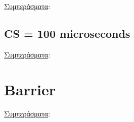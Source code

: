 \documentclass{dit}
\newcommand{\en}[1]{\foreignlanguage{english}{#1}}
\begin{document}
\underline{Συμπεράσματα}:


\newpage

\subsection*{\en{CS = 100 microseconds}}
\begin{otherlanguage}{english}

\end{otherlanguage}

\underline{Συμπεράσματα}:


\section{\en{Barrier}}

\underline{Συμπεράσματα}:
\end{document}
